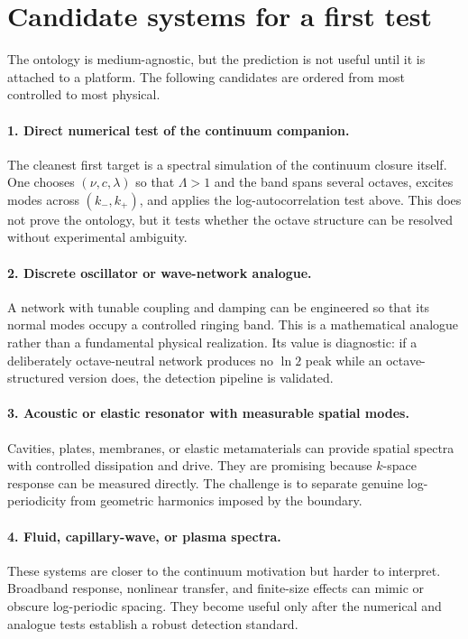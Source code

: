 \documentclass[11pt,a4paper]{article}
\begin{document}
\section{Candidate systems for a first test}\label{sec:candidates}

The ontology is medium-agnostic, but the prediction is not useful until it is attached to a platform. The following candidates are ordered from most controlled to most physical.

\paragraph{1. Direct numerical test of the continuum companion.}
The cleanest first target is a spectral simulation of the continuum closure itself. One chooses $(\nu,c,\lambda)$ so that $\Lambda>1$ and the band spans several octaves, excites modes across $(k_-,k_+)$, and applies the log-autocorrelation test above. This does not prove the ontology, but it tests whether the octave structure can be resolved without experimental ambiguity.

\paragraph{2. Discrete oscillator or wave-network analogue.}
A network with tunable coupling and damping can be engineered so that its normal modes occupy a controlled ringing band. This is a mathematical analogue rather than a fundamental physical realization. Its value is diagnostic: if a deliberately octave-neutral network produces no $\ln2$ peak while an octave-structured version does, the detection pipeline is validated.

\paragraph{3. Acoustic or elastic resonator with measurable spatial modes.}
Cavities, plates, membranes, or elastic metamaterials can provide spatial spectra with controlled dissipation and drive. They are promising because $k$-space response can be measured directly. The challenge is to separate genuine log-periodicity from geometric harmonics imposed by the boundary.

\paragraph{4. Fluid, capillary-wave, or plasma spectra.}
These systems are closer to the continuum motivation but harder to interpret. Broadband response, nonlinear transfer, and finite-size effects can mimic or obscure log-periodic spacing. They become useful only after the numerical and analogue tests establish a robust detection standard.
\end{document}
